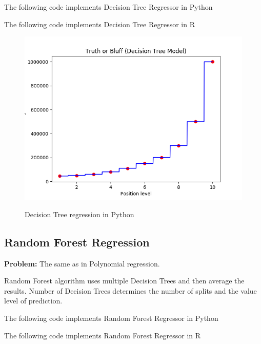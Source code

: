 \documentclass[runningheads,a4paper]{llncs}
\begin{document}
The following code implements Decision Tree Regressor in Python 

 

The following code implements Decision Tree Regressor in R 

 

\begin{figure}[H]
\centering
\begin{center}
\includegraphics[scale=0.8]{pics/decision_tree}
\label{uloha1:pic1}
\caption{Decision Tree regression in Python} 
\end{center}
\end{figure}

\subsection{Random Forest Regression}
\textbf{Problem:} The same as in Polynomial regression.

Random Forest algorithm uses multiple Decision Trees and then average the results. Number of Decision Trees determines the number of splits and the value level of prediction.

The following code implements Random Forest Regressor in Python 

 

The following code implements Random Forest Regressor in R 
\end{document}

